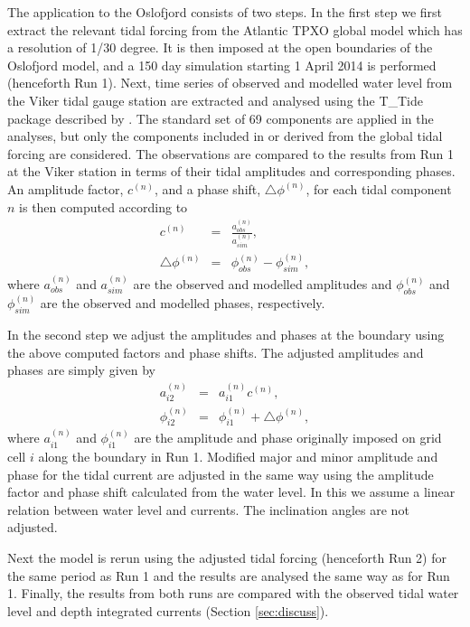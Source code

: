 The application to the Oslofjord consists of two steps. In the first step we first extract the relevant tidal forcing from the Atlantic TPXO global model which has a resolution of 1/30 degree. It is then imposed at the open boundaries of the Oslofjord model, and a 150 day simulation starting 1 April 2014 is performed (henceforth Run 1). Next, time series of observed and modelled water level from the Viker tidal gauge station are extracted and analysed using the T\_Tide package described by \cite{pawlowicz02}. The standard set of 69 components are applied in the analyses, but only the components included in or derived from the global tidal forcing are considered.
The observations are compared to the results from Run 1 at the Viker station in terms of their tidal amplitudes and corresponding phases. An amplitude factor, $c^{(n)}$, and a phase shift, $\triangle \phi^{(n)}$, for each tidal component $n$ is then computed according to
\begin{eqnarray}
c^{(n)} &=& \frac{a^{(n)}_{obs}}{a^{(n)}_{sim}}, \\
\triangle \phi^{(n)} &=& \phi^{(n)}_{obs} - \phi^{(n)}_{sim},
\end{eqnarray}
where $a^{(n)}_{obs}$ and $a^{(n)}_{sim}$ are the observed and modelled amplitudes and $\phi^{(n)}_{obs}$ and $\phi^{(n)}_{sim}$ are the observed and modelled phases, respectively. 

In the second step we adjust the amplitudes and phases at the boundary using the above computed factors and phase shifts. The adjusted amplitudes and phases are simply given by
\begin{eqnarray}
a^{(n)}_{i2} &=& a^{(n)}_{i1} c^{(n)}, \\
\phi^{(n)}_{i2} &=& \phi^{(n)}_{i1} + \triangle \phi^{(n)},
\end{eqnarray}
where $a^{(n)}_{i1}$ and $\phi^{(n)}_{i1}$ are the amplitude and phase originally imposed on grid cell $i$ along the boundary in Run 1. Modified major and minor amplitude and phase for the tidal current are adjusted in the same way using the amplitude factor and phase shift calculated from the water level. In this we assume a linear relation between water level and currents. The inclination angles are not adjusted.

Next the model is rerun using the adjusted tidal forcing (henceforth Run 2) for the same period as Run 1 and the results are analysed the same way as for Run 1. Finally, the results from both runs are compared with the observed tidal water level and depth integrated currents (Section \ref{sec:discuss}). 

